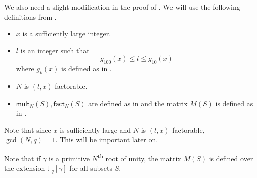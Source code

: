 \documentclass{toc}
\newcommand\F{{\mathbb{F}}}
\renewcommand\fact{\textsf{fact}}
\newcommand\mult{\textsf{mult}}
\newcommand{\ts}{\textsuperscript}
\begin{document}
We also need a slight modification in the proof of .  We will use the following definitions from .
\begin{itemize}
\item $x$ is a sufficiently large integer.
\item $l$ is an integer such that 
\[
g_{100}(x) \leq l \leq g_{10}(x)
\]
where $g_k(x)$ is defined as in .
\item $N$ is $(l,x)$-factorable.
\item $\mult_N(S), \fact_N(S)$ are defined as in  and the matrix $M(S)$ is defined as in .
\end{itemize}
\begin{remark}
Note that since $x$ is sufficiently large and $N$ is $(l,x)$-factorable, $\gcd(N,q) = 1$.  This will be important later on.  
\end{remark}
\begin{remark}
Note that if $\gamma$ is a primitive $N$\ts{th} root of unity, the matrix $M(S)$ is defined over the extension $\F_q[\gamma]$ for all subsets $S$.
\end{remark}
\end{document}
